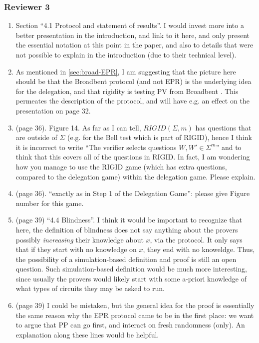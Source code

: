 \documentclass[12pt]{article}
\newcommand{\Broad}{{\sf Broadbent }}
\newcommand{\EPR}{{\sf EPR }}
\begin{document}
\subsubsection*{Reviewer 3}
\begin{enumerate}
\item Section ``4.1 Protocol and statement of results''. I would invest more into a better presentation in the introduction, and link to it here, and only present the essential notation at this point in the paper, and also to details that were not possible to explain in the introduction (due to their technical level).
 \item As mentioned in \ref{sec:broad-EPR}, I am suggesting that the picture here should be that the \Broad protocol (and not EPR) is the underlying idea for the delegation, and that rigidity is testing PV from \Broad. This permeates the description of the protocol, and will have e.g. an effect on the presentation on page 32.
     \item (page 36). Figure 14. As far as I can tell, $RIGID(\Sigma, m)$ has questions that are outside of $\Sigma$ (e.g. for the Bell test which is part of RIGID), hence I think it is incorrect to write ``The verifier selects questions $W, W' \in \Sigma^m$'' and to think that this covers all of the questions in RIGID. In fact, I am wondering how you manage to use the RIGID game (which has extra questions, compared to the delegation game) within the delegation game. Please explain.
         \item (page 36). ``exactly as in Step 1 of the Delegation Game'': please give Figure number for this game.
\item (page 39) ``4.4 Blindness''. I think it would be important to recognize that here, the definition of blindness does not say anything about the provers possibly \emph{increasing} their knowledge about $x$, via the protocol. It only says that if they start with no knowledge on $x$, they end with no knoweldge. Thus, the possibility of a simulation-based definition and proof is still an open question. Such simulation-based definition would be much more interesting, since usually the provers would likely start with some a-priori knowledge of what types of circuits they may be asked to run.
\item (page 39)
      I could be mistaken, but the general idea for the proof is essentially the same reason why the \EPR protocol came to be in the first place: we want to argue that PP can go first, and interact on fresh randomness (only). An explanation along these lines would be helpful.


\end{enumerate}
\end{document}
